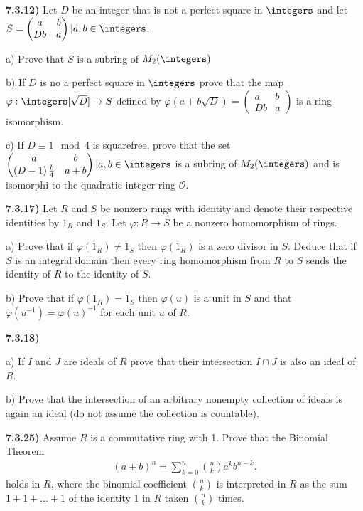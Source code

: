 \documentclass[12pt,a4paper]{article}
\newcommand{\prob}[2]{\textbf{#1)} #2}
\begin{document}
\prob{7.3.12}{
Let $D$ be an integer that is not a perfect square in $\integers$ and let $S = { \begin{pmatrix}
        a & b \\
        Db & a
\end{pmatrix} | a,b \in \integers } $.
}

a) Prove that $S$ is a subring of $M_2(\integers)$

b) If $D$ is no a perfect square in $\integers$ prove that the map $\varphi: \integers[\sqrt{D}] \to S$ defined by $\varphi\left( a + b\sqrt{D} \right) = \begin{pmatrix}
    a & b \\
    Db & a
\end{pmatrix}$ is a ring isomorphism.

c) If $D \equiv 1 \mod{4}$ is squarefree, prove that the set ${ \begin{pmatrix}
        a & b \\
        \left( D-1 \right)\frac{b}{4} & a+b
\end{pmatrix} | a,b \in \integers } $ is a subring of $M_2(\integers)$ and is isomorphi to the quadratic integer ring $\mathcal{O}$.


\prob{7.3.17}{
Let $R$ and $S$ be nonzero rings with identity and denote their respective identities by $1_{R}$ and $1_{S}$. Let $\varphi: R \rightarrow S$ be a nonzero homomorphism of rings.
}

a) Prove that if $\varphi(1_{R}) \ne 1_{S}$ then $\varphi(1_{R})$ is a zero divisor in $S$. Deduce that if $S$ is an integral domain then every ring homomorphism from $R$ to $S$ sends the identity of $R$ to the identity of $S$.

b) Prove that if $\varphi(1_{R}) = 1_{S}$ then $\varphi(u)$ is a unit in $S$ and that $\varphi\left( u^{-1} \right) = \varphi\left( u \right)^{-1}$ for each unit $u$ of $R$.

\prob{7.3.18}{}

a) If $I$ and $J$ are ideals of $R$ prove that their intersection $I \cap J$ is also an ideal of $R$.

b) Prove that the intersection of an arbitrary nonempty collection of ideals is again an ideal (do not assume the collection is countable).

\prob{7.3.25}{
Assume $R$ is a commutative ring with 1. Prove that the Binomial Theorem
\begin{align*}
    \left( a + b \right)^{n} = \sum_{k=0}^{n} {n \choose k} a^{k}b^{n-k}
.\end{align*}
holds in $R$, where the binomial coefficient $n \choose k$ is interpreted in $R$ as the sum $1 + 1 + \ldots + 1$ of the identity $1$ in $R$ taken $n \choose k$ times.
}
\end{document}
